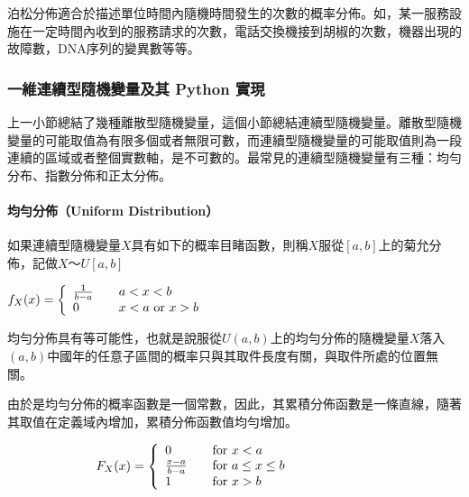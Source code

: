 \documentclass[11pt]{article}
\begin{document}
    泊松分佈適合於描述單位時間內隨機時間發生的次數的概率分佈。如，某一服務設施在一定時間內收到的服務請求的次數，電話交換機接到胡椒的次數，機器出現的故障數，DNA序列的變異數等等。

    \hypertarget{ux4e00ux7dadux9023ux7e8cux578bux96a8ux6a5fux8b8aux91cfux53caux5176-python-ux5be6ux73fe}{%
\subsubsection{一維連續型隨機變量及其 Python
實現}\label{ux4e00ux7dadux9023ux7e8cux578bux96a8ux6a5fux8b8aux91cfux53caux5176-python-ux5be6ux73fe}}

上一小節總結了幾種離散型隨機變量，這個小節總結連續型隨機變量。離散型隨機變量的可能取值為有限多個或者無限可數，而連續型隨機變量的可能取值則為一段連續的區域或者整個實數軸，是不可數的。最常見的連續型隨機變量有三種：均勻分布、指數分佈和正太分佈。

    \hypertarget{ux5747ux52fbux5206ux4f48uniform-distribution}{%
\paragraph{均勻分佈（Uniform
Distribution）}\label{ux5747ux52fbux5206ux4f48uniform-distribution}}

如果連續型隨機變量\(X\)具有如下的概率目睹函數，則稱\(X\)服從\([a,b]\)上的菊允分佈，記做\(X～U[a,b]\)

\(\begin{equation} \nonumber f_X(x) = \left\{ \begin{array}{l l} \frac{1}{b-a} & \quad a < x < b\\ 0 & \quad x < a \textrm{ or } x > b \end{array} \right. \end{equation}\)

均勻分佈具有等可能性，也就是說服從\(U(a,b)\)上的均勻分佈的隨機變量\(X\)落入\((a,b)\)中國年的任意子區間的概率只與其取件長度有關，與取件所處的位置無關。

    由於是均勻分佈的概率函數是一個常數，因此，其累積分佈函數是一條直線，隨著其取值在定義域內增加，累積分佈函數值均勻增加。

\(\begin{equation} \hspace{70pt} F_X(x) = \left\{ \begin{array}{l l} 0 & \quad \textrm{for } x < a \\ \frac{x-a}{b-a} & \quad \textrm{for }a \leq x \leq b\\ 1 & \quad \textrm{for } x > b \end{array} \right. \hspace{70pt} \end{equation}\)
\end{document}
